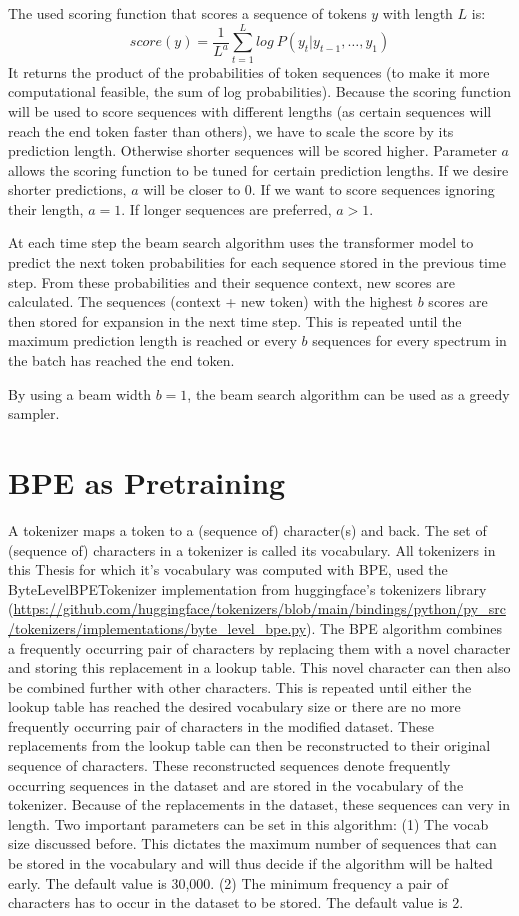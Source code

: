 The used scoring function that scores a sequence of tokens $y$ with length $L$ is:
\[score(y) = \frac{1}{L^a} \sum\limits_{t=1}^{L}log\ P(y_t | y_{t-1},\dots,y_{1})\]
It returns the product of the probabilities of token sequences (to make it more computational feasible, the sum of log probabilities).
Because the scoring function will be used to score sequences with different lengths (as certain sequences will reach the end token faster than others),
we have to scale the score by its prediction length. Otherwise shorter sequences will be scored higher.
Parameter $a$ allows the scoring function to be tuned for certain prediction lengths.
If we desire shorter predictions, $a$ will be closer to 0.
If we want to score sequences ignoring their length, $a=1$. 
If longer sequences are preferred, $a>1$.

At each time step the beam search algorithm uses the transformer model to predict the next token probabilities for each sequence stored in the previous time step.
From these probabilities and their sequence context, new scores are calculated.
The sequences (context + new token) with the highest $b$ scores are then stored for expansion in the next time step.
This is repeated until the maximum prediction length is reached or every $b$ sequences for every spectrum in the batch has reached the end token.

By using a beam width $b=1$, the beam search algorithm can be used as a greedy sampler.

\section{BPE as Pretraining}
\label{sec:bpe}

A tokenizer maps a token to a (sequence of) character(s) and back. The set of (sequence of) characters in a tokenizer is called its vocabulary.
All tokenizers in this Thesis for which it's vocabulary was computed with \acf{BPE}, used the ByteLevelBPETokenizer implementation from huggingface's tokenizers library (\url{https://github.com/huggingface/tokenizers/blob/main/bindings/python/py_src/tokenizers/implementations/byte_level_bpe.py}).
The \ac{BPE} algorithm combines a frequently occurring pair of characters by replacing them with a novel character and storing this replacement in a lookup table.
This novel character can then also be combined further with other characters. 
This is repeated until either the lookup table has reached the desired vocabulary size or there are no more frequently occurring pair of characters in the modified dataset.
These replacements from the lookup table can then be reconstructed to their original sequence of characters.
These reconstructed sequences denote frequently occurring sequences in the dataset and are stored in the vocabulary of the tokenizer.
Because of the replacements in the dataset, these sequences can very in length.
Two important parameters can be set in this algorithm:
(1) The vocab size discussed before. This dictates the maximum number of sequences that can be stored in the vocabulary and will thus decide if the algorithm will be halted early. The default value is 30,000.
(2) The minimum frequency a pair of characters has to occur in the dataset to be stored. The default value is 2.

